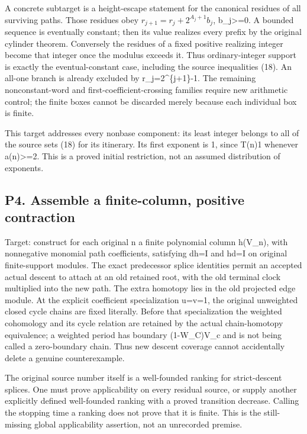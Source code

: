 A concrete subtarget is a height-escape statement for the canonical
residues of all surviving paths. Those residues obey
\(r_{j+1}=r_j+2^{A_j+1}b_j\), b\_j\textgreater=0. A bounded sequence is
eventually constant; then its value realizes every prefix by the
original cylinder theorem. Conversely the residues of a fixed positive
realizing integer become that integer once the modulus exceeds it. Thus
ordinary-integer support is exactly the eventual-constant case,
including the source inequalities (18). An all-one branch is already
excluded by r\_j=2\^{}\{j+1\}-1. The remaining nonconstant-word and
first-coefficient-crossing families require new arithmetic control; the
finite boxes cannot be discarded merely because each individual box is
finite.

This target addresses every nonbase component: its least integer belongs
to all of the source sets (18) for its itinerary. Its first exponent is
1, since T(n)1 whenever a(n)\textgreater=2. This is a proved initial
restriction, not an assumed distribution of exponents.

\subsection{P4. Assemble a finite-column, positive contraction}

Target: construct for each original n a finite polynomial column
h(V\_n), with nonnegative monomial path coefficients, satisfying dh=I
and hd=I on original finite-support modules. The exact predecessor
splice identities permit an accepted actual descent to attach at an old
retained root, with the old terminal clock multiplied into the new path.
The extra homotopy lies in the old projected edge module. At the
explicit coefficient specialization u=v=1, the original unweighted
closed cycle chains are fixed literally. Before that specialization the
weighted cohomology and its cycle relation are retained by the actual
chain-homotopy equivalence; a weighted period has boundary (1-W\_C)V\_c
and is not being called a zero-boundary chain. Thus new descent coverage
cannot accidentally delete a genuine counterexample.

The original source number itself is a well-founded ranking for
strict-descent splices. One must prove applicability on every residual
source, or supply another explicitly defined well-founded ranking with a
proved transition decrease. Calling the stopping time a ranking does not
prove that it is finite. This is the still-missing global applicability
assertion, not an unrecorded premise.

